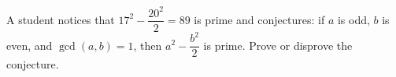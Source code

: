 A student notices that $17^2-\dfrac{20^2}{2}=89$ is prime and conjectures: if $a$ is odd, $b$ is even, and $\gcd(a,b)=1$, then $a^2-\dfrac{b^2}{2}$ is prime. Prove or disprove the conjecture.

